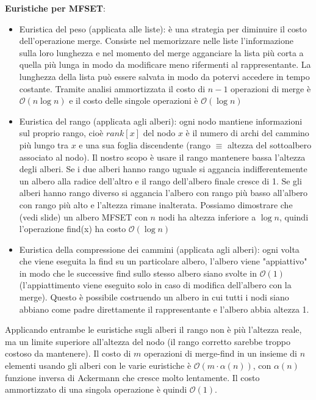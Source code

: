 \documentclass[../cheatSheetAlgoritmi.tex]{subfiles}
\begin{document}
\bigskip

\textbf{Euristiche per MFSET}:
\begin{itemize}
	\item Euristica del peso (applicata alle liste): è una strategia per diminuire il costo dell'operazione merge. Consiste nel memorizzare nelle liste l'informazione sulla loro lunghezza e nel momento del merge agganciare la lista più corta a quella più lunga in modo da modificare meno rifermenti al rappresentante. La lunghezza della lista può essere salvata in modo da potervi accedere in tempo costante. Tramite analisi ammortizzata il costo di $n-1$ operazioni di merge è $\mathcal{O}(n \log n)$ e il costo delle singole operazioni è $\mathcal{O}(\log n)$
	\item Euristica del rango (applicata agli alberi): ogni nodo mantiene informazioni sul proprio rango, cioè $rank[x]$ del nodo $x$ è il numero di archi del cammino più lungo tra $x$ e una sua foglia discendente (rango $\equiv$ altezza del sottoalbero associato al nodo). Il nostro scopo è usare il rango mantenere bassa l'altezza degli alberi. Se i due alberi hanno rango uguale si aggancia indifferentemente un albero alla radice dell'altro e il rango dell'albero finale cresce di 1. Se gli alberi hanno rango diverso si aggancia l'albero con rango più basso all'albero con rango più alto e l'altezza rimane inalterata. Possiamo dimostrare che (vedi slide) un albero MFSET con $n$ nodi ha altezza inferiore a $\log n$, quindi l'operazione find(x) ha costo $\mathcal{O}(\log n)$
	\item Euristica della compressione dei cammini (applicata agli alberi): ogni volta che viene eseguita la find su un particolare albero, l'albero viene "appiattivo" in modo che le successive find sullo stesso albero siano svolte in $\mathcal{O}(1)$ (l'appiattimento viene eseguito solo in caso di modifica dell'albero con la merge). Questo è possibile costruendo un albero in cui tutti i nodi siano abbiano come padre direttamente il rappresentante e l'albero abbia altezza 1.  
\end{itemize}
Applicando entrambe le euristiche sugli alberi il rango non è più l'altezza reale, ma un limite superiore all'altezza del nodo (il rango corretto sarebbe troppo costoso da mantenere). Il costo di $m$ operazioni di merge-find in un insieme di $n$ elementi usando gli alberi con le varie euristiche è  $\mathcal{O}(m \cdot \alpha(n))$, con $\alpha(n)$ funzione inversa di Ackermann che cresce molto lentamente. Il costo ammortizzato di una singola operazione è quindi $\mathcal{O}(1)$. 
\end{document}
